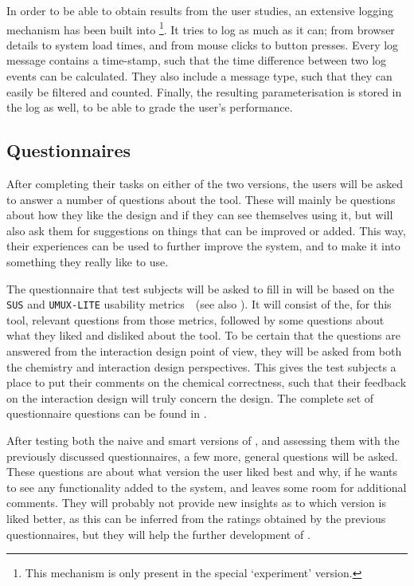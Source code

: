 In order to be able to obtain results from the user studies, an extensive logging mechanism has been built into \oframp\footnote{This mechanism is only present in the special `experiment' version.}. It tries to log as much as it can; from browser details to system load times, and from mouse clicks to button presses. Every log message contains a time-stamp, such that the time difference between two log events can be calculated. They also include a message type, such that they can easily be filtered and counted. Finally, the resulting parameterisation is stored in the log as well, to be able to grade the user's performance.


\subsection{Questionnaires}
After completing their tasks on either of the two versions, the users will be asked to answer a number of questions about the tool. These will mainly be questions about how they like the design and if they can see themselves using it, but will also ask them for suggestions on things that can be improved or added. This way, their experiences can be used to further improve the system, and to make it into something they really like to use.

The questionnaire that test subjects will be asked to fill in will be based on the \verb|SUS| and \verb|UMUX-LITE| usability metrics~\cite{lewis2013umux}~(see also ). It will consist of the, for this tool, relevant questions from those metrics, followed by some questions about what they liked and disliked about the tool. To be certain that the questions are answered from the interaction design point of view, they will be asked from both the chemistry and interaction design perspectives. This gives the test subjects a place to put their comments on the chemical correctness, such that their feedback on the interaction design will truly concern the design. The complete set of questionnaire questions can be found in .

After testing both the naive and smart versions of \oframp, and assessing them with the previously discussed questionnaires, a few more, general questions will be asked. These questions are about what version the user liked best and why, if he wants to see any functionality added to the system, and leaves some room for additional comments. They will probably not provide new insights as to which version is liked better, as this can be inferred from the ratings obtained by the previous questionnaires, but they will help the further development of \oframp.

